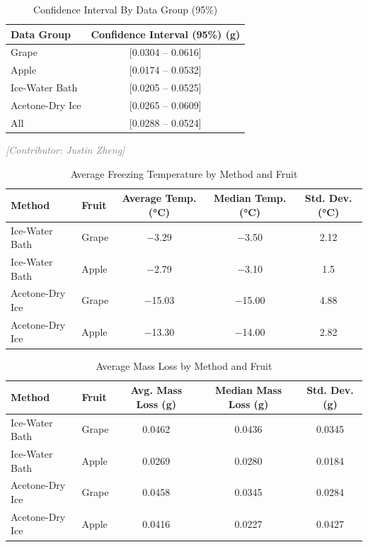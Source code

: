 \documentclass[12pt, a4paper]{article}
\newcommand{\contributor}[1]{\vspace{4pt}\noindent\textcolor{gray}{\small\textit{[Contributor: #1]}}\vspace{2pt}}
\begin{document}
\begin{table}[t]
\centering
\caption{Confidence Interval By Data Group (95\%)}
\label{tab:ci_group}
\begin{tabular}{lc}
\toprule
Data Group & Confidence Interval (95\%) (g) \\
\midrule
Grape          & [0.0304 -- 0.0616] \\
Apple          & [0.0174 -- 0.0532] \\
Ice-Water Bath & [0.0205 -- 0.0525] \\
Acetone-Dry Ice & [0.0265 -- 0.0609] \\
All            & [0.0288 -- 0.0524] \\
\bottomrule
\end{tabular}
\end{table}


\contributor{Justin Zheng}

\begin{table}[t]
\centering
\caption{Average Freezing Temperature by Method and Fruit}
\label{tab:temp}
\begin{tabular}{llccc}
\toprule
Method & Fruit & Average Temp. (°C) & Median Temp. (°C) & Std. Dev. (°C) \\
\midrule
Ice-Water Bath   & Grape & $-$3.29  & $-$3.50  & 2.12 \\
Ice-Water Bath   & Apple & $-$2.79  & $-$3.10  & 1.5  \\
Acetone-Dry Ice  & Grape & $-$15.03 & $-$15.00 & 4.88 \\
Acetone-Dry Ice  & Apple & $-$13.30 & $-$14.00 & 2.82 \\
\bottomrule
\end{tabular}
\end{table}

\begin{table}[t]
\centering
\caption{Average Mass Loss by Method and Fruit}
\label{tab:mass}
\begin{tabular}{llccc}
\toprule
Method & Fruit & Avg. Mass Loss (g) & Median Mass Loss (g) & Std. Dev. (g) \\
\midrule
Ice-Water Bath   & Grape & 0.0462 & 0.0436 & 0.0345 \\
Ice-Water Bath   & Apple & 0.0269 & 0.0280 & 0.0184 \\
Acetone-Dry Ice  & Grape & 0.0458 & 0.0345 & 0.0284 \\
Acetone-Dry Ice  & Apple & 0.0416 & 0.0227 & 0.0427 \\
\bottomrule
\end{tabular}
\end{table}
\end{document}
